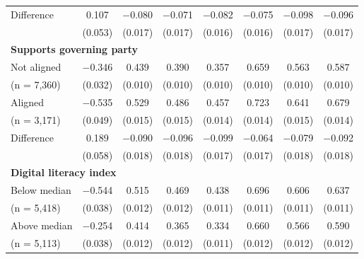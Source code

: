 \begin{tabular}[t]{lccccccc}
\hspace{1em} Difference & \num{0.107} & \num{-0.080} & \num{-0.071} & \num{-0.082} & \num{-0.075} & \num{-0.098} & \num{-0.096}\\
\hspace{2em} & (\num{0.053}) & (\num{0.017}) & (\num{0.017}) & (\num{0.016}) & (\num{0.016}) & (\num{0.017}) & (\num{0.017})\\\multicolumn{4}{l}{\textbf{Supports governing party}} \rule{0pt}{1.2\normalbaselineskip}\\
\hspace{1em} Not aligned & \num{-0.346} & \num{0.439} & \num{0.390} & \num{0.357} & \num{0.659} & \num{0.563} & \num{0.587}\\
\hspace{2em}(n = 7,360) & (\num{0.032}) & (\num{0.010}) & (\num{0.010}) & (\num{0.010}) & (\num{0.010}) & (\num{0.010}) & (\num{0.010})\\
\hspace{1em} Aligned & \num{-0.535} & \num{0.529} & \num{0.486} & \num{0.457} & \num{0.723} & \num{0.641} & \num{0.679}\\
\hspace{2em}(n = 3,171) & (\num{0.049}) & (\num{0.015}) & (\num{0.015}) & (\num{0.014}) & (\num{0.014}) & (\num{0.015}) & (\num{0.014})\\\cmidrule(lr){2-8}
\hspace{1em} Difference & \num{0.189} & \num{-0.090} & \num{-0.096} & \num{-0.099} & \num{-0.064} & \num{-0.079} & \num{-0.092}\\
\hspace{2em} & (\num{0.058}) & (\num{0.018}) & (\num{0.018}) & (\num{0.017}) & (\num{0.017}) & (\num{0.018}) & (\num{0.018})\\\multicolumn{4}{l}{\textbf{Digital literacy index}} \rule{0pt}{1.2\normalbaselineskip}\\
\hspace{1em} Below median & \num{-0.544} & \num{0.515} & \num{0.469} & \num{0.438} & \num{0.696} & \num{0.606} & \num{0.637}\\
\hspace{2em}(n = 5,418) & (\num{0.038}) & (\num{0.012}) & (\num{0.012}) & (\num{0.011}) & (\num{0.011}) & (\num{0.011}) & (\num{0.011})\\
\hspace{1em} Above median & \num{-0.254} & \num{0.414} & \num{0.365} & \num{0.334} & \num{0.660} & \num{0.566} & \num{0.590}\\
\hspace{2em}(n = 5,113) & (\num{0.038}) & (\num{0.012}) & (\num{0.012}) & (\num{0.011}) & (\num{0.012}) & (\num{0.012}) & (\num{0.012})\\\cmidrule(lr){2-8}

\end{tabular}
